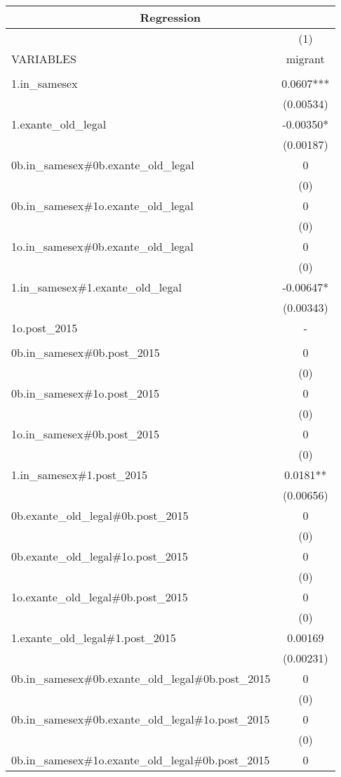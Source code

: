 \documentclass[]{article}
\begin{document}
\begin{tabular}{lc}
\multicolumn{2}{c}{Regression} \\ \hline
 & (1) \\
VARIABLES & migrant \\ \hline
 &  \\
1.in\_samesex & 0.0607*** \\
 & (0.00534) \\
1.exante\_old\_legal & -0.00350* \\
 & (0.00187) \\
0b.in\_samesex\#0b.exante\_old\_legal & 0 \\
 & (0) \\
0b.in\_samesex\#1o.exante\_old\_legal & 0 \\
 & (0) \\
1o.in\_samesex\#0b.exante\_old\_legal & 0 \\
 & (0) \\
1.in\_samesex\#1.exante\_old\_legal & -0.00647* \\
 & (0.00343) \\
1o.post\_2015 & - \\
 &  \\
0b.in\_samesex\#0b.post\_2015 & 0 \\
 & (0) \\
0b.in\_samesex\#1o.post\_2015 & 0 \\
 & (0) \\
1o.in\_samesex\#0b.post\_2015 & 0 \\
 & (0) \\
1.in\_samesex\#1.post\_2015 & 0.0181** \\
 & (0.00656) \\
0b.exante\_old\_legal\#0b.post\_2015 & 0 \\
 & (0) \\
0b.exante\_old\_legal\#1o.post\_2015 & 0 \\
 & (0) \\
1o.exante\_old\_legal\#0b.post\_2015 & 0 \\
 & (0) \\
1.exante\_old\_legal\#1.post\_2015 & 0.00169 \\
 & (0.00231) \\
0b.in\_samesex\#0b.exante\_old\_legal\#0b.post\_2015 & 0 \\
 & (0) \\
0b.in\_samesex\#0b.exante\_old\_legal\#1o.post\_2015 & 0 \\
 & (0) \\
0b.in\_samesex\#1o.exante\_old\_legal\#0b.post\_2015 & 0 \\

\end{tabular}
\end{document}
